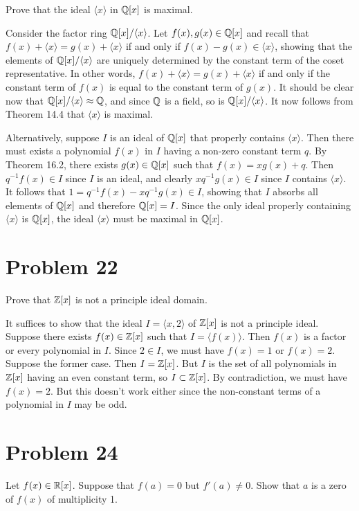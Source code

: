 \documentclass{article}
\begin{document}
Prove that the ideal $\langle x\rangle$ in $\mathbb{Q}[x]$ is maximal.

Consider the factor ring $\mathbb{Q}[x]/\langle x\rangle$.
Let $f(x),g(x)\in\mathbb{Q}[x]$ and recall that
$f(x)+\langle x\rangle=g(x)+\langle x\rangle$ if and only if
$f(x)-g(x)\in\langle x\rangle$, showing that the elements of
$\mathbb{Q}[x]/\langle x\rangle$ are uniquely determined by the
constant term of the coset representative.  In other words,
$f(x)+\langle x\rangle=g(x)+\langle x\rangle$ if and only if
the constant term of $f(x)$ is equal to the constant term of $g(x)$.
It should be
clear now that $\mathbb{Q}[x]/\langle x\rangle\approx\mathbb{Q}$, and since
$\mathbb{Q}$ is a field, so is $\mathbb{Q}[x]/\langle x\rangle$.
It now follows from Theorem 14.4 that $\langle x\rangle$ is maximal.

Alternatively, suppose $I$ is an ideal of $\mathbb{Q}[x]$ that properly
contains $\langle x\rangle$.  Then there must exists a polynomial $f(x)$
in $I$ having a non-zero constant term $q$.  By Theorem 16.2,
there exists $g(x)\in\mathbb{Q}[x]$ such that $f(x)=xg(x)+q$.
Then $q^{-1}f(x)\in I$ since $I$ is an ideal, and clearly $xq^{-1}g(x)\in I$
since $I$ contains $\langle x\rangle$.  It follows that
$1=q^{-1}f(x)-xq^{-1}g(x)\in I$, showing that $I$ absorbs all elements
of $\mathbb{Q}[x]$ and therefore $\mathbb{Q}[x]=I$.  Since the only ideal properly
containing $\langle x\rangle$ is $\mathbb{Q}[x]$, the ideal $\langle x\rangle$
must be maximal in $\mathbb{Q}[x]$.

\section*{Problem 22}

Prove that $\mathbb{Z}[x]$ is not a principle ideal domain.

It suffices to show that the ideal $I=\langle x,2\rangle$ of $\mathbb{Z}[x]$
is not a principle ideal.
Suppose there exists $f(x)\in\mathbb{Z}[x]$ such that $I=\langle f(x)\rangle$.
Then $f(x)$ is a factor or every polynomial in $I$.
Since $2\in I$, we must have $f(x)=1$ or $f(x)=2$.
Suppose the former case.  Then $I=\mathbb{Z}[x]$.  But $I$ is the set of all
polynomials in $\mathbb{Z}[x]$ having an even constant term, so $I\subset\mathbb{Z}[x]$.
By contradiction, we must have $f(x)=2$.  But this doesn't work either
since the non-constant terms of a polynomial in $I$ may be odd.

\section*{Problem 24}

Let $f(x)\in\mathbb{R}[x]$.  Suppose that $f(a)=0$ but $f'(a)\neq 0$.
Show that $a$ is a zero of $f(x)$ of multiplicity 1.
\end{document}
